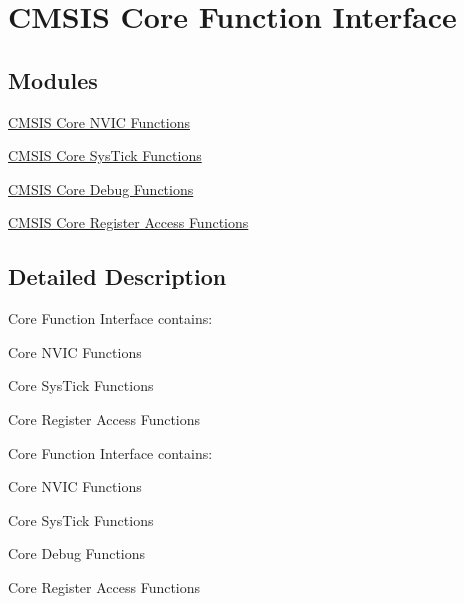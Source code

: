 \hypertarget{group___c_m_s_i_s___core___function_interface}{\section{C\-M\-S\-I\-S Core Function Interface}
\label{group___c_m_s_i_s___core___function_interface}
}
\subsection*{Modules}
\begin{DoxyCompactItemize}
\item 
\hyperlink{group___c_m_s_i_s___core___n_v_i_c_functions}{C\-M\-S\-I\-S Core N\-V\-I\-C Functions}
\item 
\hyperlink{group___c_m_s_i_s___core___sys_tick_functions}{C\-M\-S\-I\-S Core Sys\-Tick Functions}
\item 
\hyperlink{group___c_m_s_i_s__core___debug_functions}{C\-M\-S\-I\-S Core Debug Functions}
\item 
\hyperlink{group___c_m_s_i_s___core___reg_acc_functions}{C\-M\-S\-I\-S Core Register Access Functions}
\end{DoxyCompactItemize}


\subsection{Detailed Description}
Core Function Interface contains\-:
\begin{DoxyItemize}
\item Core N\-V\-I\-C Functions
\item Core Sys\-Tick Functions
\item Core Register Access Functions
\end{DoxyItemize}

Core Function Interface contains\-:
\begin{DoxyItemize}
\item Core N\-V\-I\-C Functions
\item Core Sys\-Tick Functions
\item Core Debug Functions
\item Core Register Access Functions 
\end{DoxyItemize}
